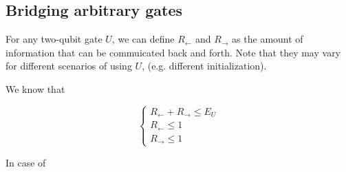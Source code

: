 \documentclass{article}
\begin{document}
\subsection*{Bridging arbitrary gates}

For any two-qubit gate $U$, we can define $R_\leftarrow$ and $R_\rightarrow$ as the amount of information that can be commuicated back and forth. Note that they may vary for different scenarios of using $U$, (e.g. different initialization).

We know that

\begin{equation}
  \begin{cases} 
    R_{\leftarrow} + R_{\rightarrow} \le E_U \\
    R_{\leftarrow} \le 1 \\
    R_{\rightarrow} \le 1
  \end{cases}
\end{equation}

In case of 
\end{document}
